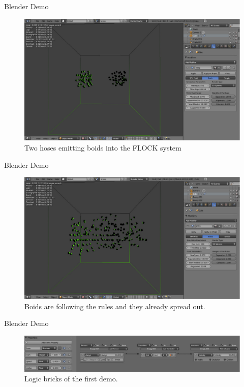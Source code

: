 \documentclass[red]{beamer}
\begin{document}
\begin{frame}{Blender Demo}
	\begin{figure}[htbp]
	\begin{center}
	\includegraphics[scale=0.20]{../figures/demo1_1.pdf}
	\caption{Two hoses emitting boids into the FLOCK system}
	\end{center}
\end{figure}
\end{frame}

\begin{frame}{Blender Demo}
	\begin{figure}[htbp]
	\begin{center}
	\includegraphics[scale=0.20]{../figures/demo1_2.pdf}
	\caption{Boids are following the rules and they already spread out.}
	\end{center}
	\end{figure}
\end{frame}

\begin{frame}{Blender Demo}
	\begin{figure}[htbp]
	\begin{center}
	\includegraphics[scale=0.20]{../figures/demo1_logic.pdf}
	\caption{Logic bricks of the first demo.}
	\end{center}
	\end{figure}
\end{frame}
\end{document}

